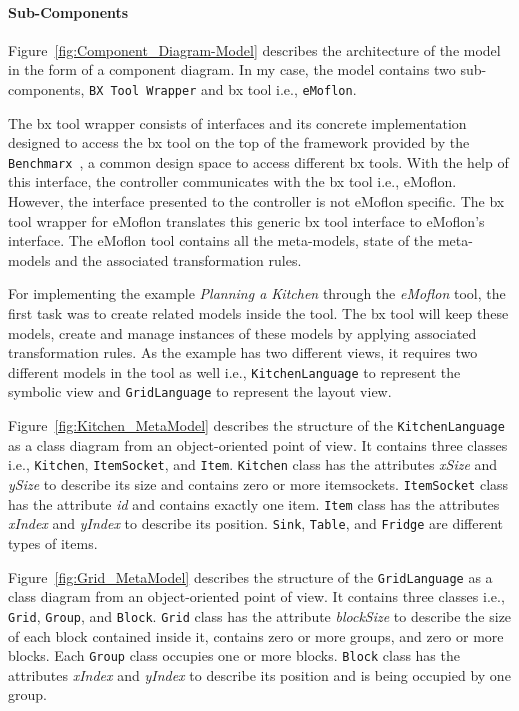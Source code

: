 \paragraph{Sub-Components}
Figure~\ref{fig:Component_Diagram-Model} describes the architecture of the model in the form of a component diagram. In my case, the model contains two sub-components, \texttt{BX Tool Wrapper} and bx tool i.e., \texttt{eMoflon}. 

The bx tool wrapper consists of interfaces and its concrete implementation designed to access the bx tool on the top of the framework provided by the \texttt{Benchmarx}~\cite{benchmarx-reload}, a common design space to access different bx tools. With the help of this interface, the controller communicates with the bx tool i.e., eMoflon. However, the interface presented to the controller is not eMoflon specific. The bx tool wrapper for eMoflon translates this generic bx tool interface to eMoflon's interface. The eMoflon tool contains all the meta-models, state of the meta-models and the associated transformation rules.

For implementing the example \textit{Planning a Kitchen} through the \textit{eMoflon} tool, the first task was to create related models inside the tool. The bx tool will keep these models, create and manage instances of these models by applying associated transformation rules. As the example has two different views, it requires two different models in the tool as well i.e., \texttt{KitchenLanguage} to represent the symbolic view and \texttt{GridLanguage} to represent the layout view.

Figure~\ref{fig:Kitchen_MetaModel} describes the structure of the \texttt{KitchenLanguage} as a class diagram from an object-oriented point of view. It contains three classes i.e., \texttt{Kitchen}, \texttt{ItemSocket}, and \texttt{Item}. \texttt{Kitchen} class has the attributes \textit{xSize} and \textit{ySize} to describe its size and contains zero or more itemsockets. \texttt{ItemSocket} class has the attribute \textit{id} and contains exactly one item. \texttt{Item} class has the attributes \textit{xIndex} and \textit{yIndex} to describe its position. \texttt{Sink}, \texttt{Table}, and \texttt{Fridge} are different types of items.

Figure~\ref{fig:Grid_MetaModel} describes the structure of the \texttt{GridLanguage} as a class diagram from an object-oriented point of view. It contains three classes i.e., \texttt{Grid}, \texttt{Group}, and \texttt{Block}. \texttt{Grid} class has the attribute \textit{blockSize} to describe the size of each block contained inside it, contains zero or more groups, and zero or more blocks. Each \texttt{Group} class occupies one or more blocks. \texttt{Block} class has the attributes \textit{xIndex} and \textit{yIndex} to describe its position and is being occupied by one group.

